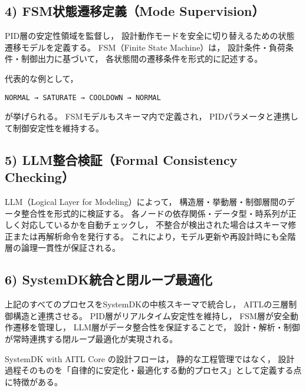 \subsection{4) FSM状態遷移定義（Mode Supervision）}
PID層の安定性領域を監督し，
設計動作モードを安全に切り替えるための状態遷移モデルを定義する。
FSM（Finite State Machine）は，
設計条件・負荷条件・制御出力に基づいて，
各状態間の遷移条件を形式的に記述する。

代表的な例として，
\begin{center}
\texttt{NORMAL → SATURATE → COOLDOWN → NORMAL}
\end{center}
が挙げられる。
FSMモデルもスキーマ内で定義され，
PIDパラメータと連携して制御安定性を維持する。

\subsection{5) LLM整合検証（Formal Consistency Checking）}
LLM（Logical Layer for Modeling）によって，
構造層・挙動層・制御層間のデータ整合性を形式的に検証する。
各ノードの依存関係・データ型・時系列が正しく対応しているかを自動チェックし，
不整合が検出された場合はスキーマ修正または再解析命令を発行する。
これにより，モデル更新や再設計時にも全階層の論理一貫性が保証される。

\subsection{6) SystemDK統合と閉ループ最適化}
上記のすべてのプロセスをSystemDKの中核スキーマで統合し，
AITLの三層制御構造と連携させる。
PID層がリアルタイム安定性を維持し，
FSM層が安全動作遷移を管理し，
LLM層がデータ整合性を保証することで，
設計・解析・制御が常時連携する閉ループ最適化が実現される。

SystemDK with AITL Core の設計フローは，
静的な工程管理ではなく，
設計過程そのものを「自律的に安定化・最適化する動的プロセス」として定義する点に特徴がある。
